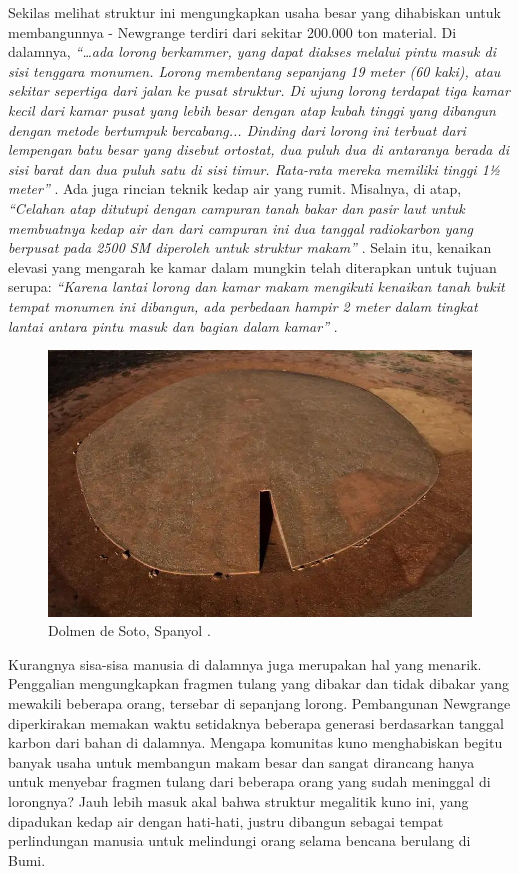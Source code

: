 \documentclass[10pt,twocolumn,letterpaper]{article}
\begin{document}
Sekilas melihat struktur ini mengungkapkan usaha besar yang dihabiskan untuk membangunnya - Newgrange terdiri dari sekitar 200.000 ton material. Di dalamnya, \textit{“…ada lorong berkammer, yang dapat diakses melalui pintu masuk di sisi tenggara monumen. Lorong membentang sepanjang 19 meter (60 kaki), atau sekitar sepertiga dari jalan ke pusat struktur. Di ujung lorong terdapat tiga kamar kecil dari kamar pusat yang lebih besar dengan atap kubah tinggi yang dibangun dengan metode bertumpuk bercabang... Dinding dari lorong ini terbuat dari lempengan batu besar yang disebut ortostat, dua puluh dua di antaranya berada di sisi barat dan dua puluh satu di sisi timur. Rata-rata mereka memiliki tinggi 1½ meter”} \cite{70}. Ada juga rincian teknik kedap air yang rumit. Misalnya, di atap, \textit{“Celahan atap ditutupi dengan campuran tanah bakar dan pasir laut untuk membuatnya kedap air dan dari campuran ini dua tanggal radiokarbon yang berpusat pada 2500 SM diperoleh untuk struktur makam”} \cite{71}. Selain itu, kenaikan elevasi yang mengarah ke kamar dalam mungkin telah diterapkan untuk tujuan serupa: \textit{“Karena lantai lorong dan kamar makam mengikuti kenaikan tanah bukit tempat monumen ini dibangun, ada perbedaan hampir 2 meter dalam tingkat lantai antara pintu masuk dan bagian dalam kamar”} \cite{71}.

\begin{figure}[t]
\begin{center}
   \includegraphics[width=1\linewidth]{dolmen.jpg}
\end{center}
   \caption{Dolmen de Soto, Spanyol \cite{53}.}
\label{fig:9}
\label{fig:onecol}
\end{figure}

Kurangnya sisa-sisa manusia di dalamnya juga merupakan hal yang menarik. Penggalian mengungkapkan fragmen tulang yang dibakar dan tidak dibakar yang mewakili beberapa orang, tersebar di sepanjang lorong. Pembangunan Newgrange diperkirakan memakan waktu setidaknya beberapa generasi berdasarkan tanggal karbon dari bahan di dalamnya. Mengapa komunitas kuno menghabiskan begitu banyak usaha untuk membangun makam besar dan sangat dirancang hanya untuk menyebar fragmen tulang dari beberapa orang yang sudah meninggal di lorongnya? Jauh lebih masuk akal bahwa struktur megalitik kuno ini, yang dipadukan kedap air dengan hati-hati, justru dibangun sebagai tempat perlindungan manusia untuk melindungi orang selama bencana berulang di Bumi.
\end{document}
